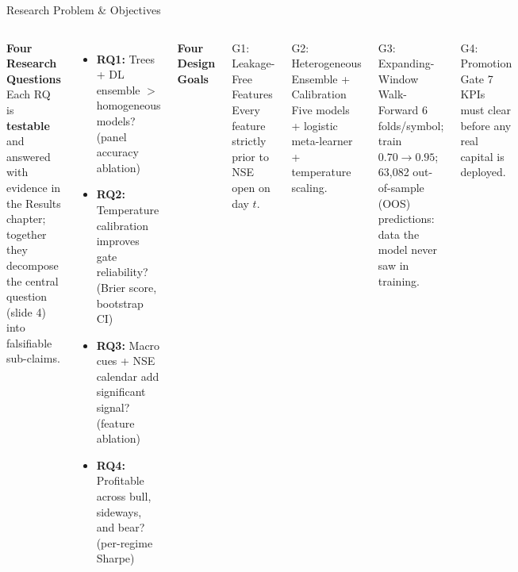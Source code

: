 \documentclass[10pt,aspectratio=43]{beamer}
\newcommand{\gd}[1]{\textcolor{secondary}{\textbf{#1}}}
\newcommand{\vsep}{\vspace{0.04cm}}
\begin{document}
\begin{frame}{Research Problem \& Objectives}
  \begin{columns}[T]
      \gd{\textbf{Four Research Questions}}
      \vsep
      {\footnotesize Each RQ is \textbf{testable} and answered with evidence in the Results chapter; together they decompose the central question (slide 4) into falsifiable sub-claims.}
      \vsep
      \begin{itemize}\itemsep3pt
        \item \textbf{RQ1:} Trees + DL ensemble $>$ homogeneous models? \hfill {\scriptsize(panel accuracy ablation)}
        \item \textbf{RQ2:} Temperature calibration improves gate reliability? \hfill {\scriptsize(Brier score, bootstrap CI)}
        \item \textbf{RQ3:} Macro cues + NSE calendar add significant signal? \hfill {\scriptsize(feature ablation)}
        \item \textbf{RQ4:} Profitable across bull, sideways, and bear? \hfill {\scriptsize(per-regime Sharpe)}
      \end{itemize}
      \gd{\textbf{Four Design Goals}}
      \vsep
      \begin{block}{G1: Leakage-Free Features}
        \footnotesize Every feature strictly prior to NSE open on day $t$.
      \end{block}
      \vspace{0.08cm}
      \begin{block}{G2: Heterogeneous Ensemble + Calibration}
        \footnotesize Five models + logistic meta-learner + temperature scaling.
      \end{block}
      \vspace{0.08cm}
      \begin{block}{G3: Expanding-Window Walk-Forward}
        \footnotesize 6 folds/symbol; train $0.70\to0.95$; 63,082 out-of-sample (OOS) predictions: data the model never saw in training.
      \end{block}
      \vspace{0.08cm}
      \begin{block}{G4: Promotion Gate}
        \footnotesize 7 KPIs must clear before any real capital is deployed.
      \end{block}
  \end{columns}
\end{frame}
\end{document}
